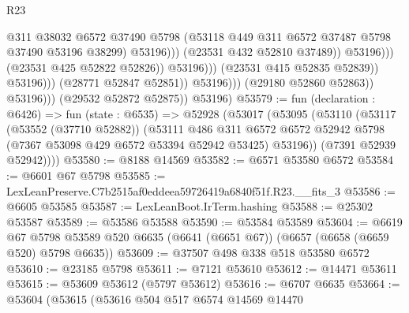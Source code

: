 \begin{lexlean}{R23}
\begin{coremodule}
                                                      @311
                                                      @38032
                                                      @6572
                                                      @37490
                                                      @5798
                                                      (@53118
                                                        @449
                                                        @311
                                                        @6572
                                                        @37487
                                                        @5798
                                                        @37490
                                                        @53196
                                                        @38299)
                                                      @53196)))
                                                (@23531 @432 @52810 @37489))
                                              @53196)))
                                        (@23531 @425 @52822 @52826))
                                      @53196)))
                                (@23531 @415 @52835 @52839))
                              @53196)))
                        (@28771 @52847 @52851))
                      @53196)))
                (@29180 @52860 @52863))
              @53196)))
        (@29532 @52872 @52875))
      @53196)
@53579 := fun (declaration : @6426) =>
  fun (state : @6535) =>
  @52928
    (@53017
      (@53095
        (@53110
          (@53117
            (@53552 (@37710 @52882))
            (@53111
              @486
              @311
              @6572
              @6572
              @52942
              @5798
              (@7367 @53098 @429 @6572 @53394 @52942 @53425)
              @53196))
          (@7391 @52939 @52942))))
@53580 := @8188 @14569
@53582 := @6571 @53580 @6572
@53584 := @6601 @67 @5798
@53585 := LexLeanPreserve.C7b2515af0eddeea59726419a6840f51f.R23.__fits_3
@53586 := @6605 @53585
@53587 := LexLeanBoot.IrTerm.hashing
@53588 := @25302 @53587
@53589 := @53586 @53588
@53590 := @53584 @53589
@53604 := @6619
    @67
    @5798
    @53589
    @520
    @6635
    (@6641 (@6651 @67))
    (@6657 (@6658 (@6659 @520) @5798 @6635))
@53609 := @37507 @498 @338 @518 @53580 @6572
@53610 := @23185 @5798
@53611 := @7121 @53610
@53612 := @14471 @53611
@53615 := @53609 @53612 (@5797 @53612)
@53616 := @6707 @6635
@53664 := @53604
    (@53615
      (@53616
        @504
        @517
        @6574
        @14569
        @14470

\end{coremodule}
\end{lexlean}
